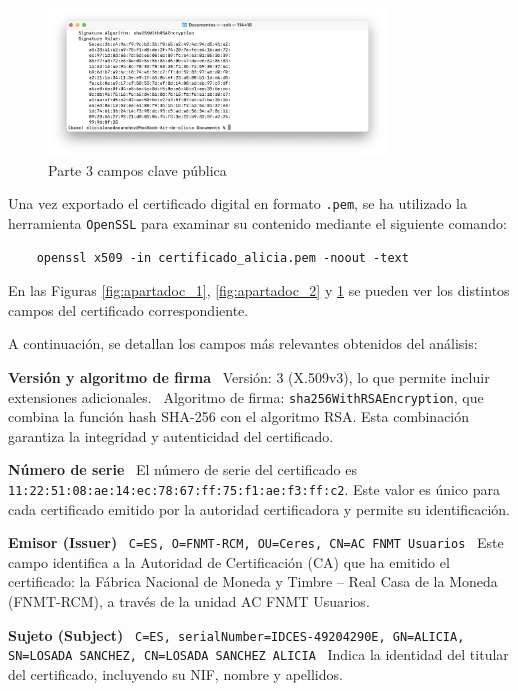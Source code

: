 \begin{figure}[H]
    \centering
    \includegraphics[width=0.8\textwidth]{apartadoc_3.png}
    \caption{Parte 3 campos clave pública}
    \label{fig:apartadoc_3}
\end{figure}

Una vez exportado el certificado digital en formato \texttt{.pem}, se ha utilizado la herramienta \texttt{OpenSSL} para examinar su contenido mediante el siguiente comando:


\begin{verbatim}
    openssl x509 -in certificado_alicia.pem -noout -text
\end{verbatim}



En las Figuras \ref{fig:apartadoc_1}, \ref{fig:apartadoc_2} y \ref{fig:apartadoc_3} se pueden ver los distintos campos del certificado correspondiente.  

A continuación, se detallan los campos más relevantes obtenidos del análisis:

\textbf{Versión y algoritmo de firma} \ Versión: 3 (X.509v3), lo que permite incluir extensiones adicionales. \ Algoritmo de firma: \texttt{sha256WithRSAEncryption}, que combina la función hash SHA-256 con el algoritmo RSA. Esta combinación garantiza la integridad y autenticidad del certificado.

\textbf{Número de serie} \ El número de serie del certificado es \texttt{11:22:51:08:ae:14:ec:78:67:ff:75:f1:ae:f3:ff:c2}. Este valor es único para cada certificado emitido por la autoridad certificadora y permite su identificación.

\textbf{Emisor (Issuer)} \ \texttt{C=ES, O=FNMT-RCM, OU=Ceres, CN=AC FNMT Usuarios} \ Este campo identifica a la Autoridad de Certificación (CA) que ha emitido el certificado: la Fábrica Nacional de Moneda y Timbre – Real Casa de la Moneda (FNMT-RCM), a través de la unidad AC FNMT Usuarios.

\textbf{Sujeto (Subject)} \ \texttt{C=ES, serialNumber=IDCES-49204290E, GN=ALICIA, SN=LOSADA SANCHEZ, CN=LOSADA SANCHEZ ALICIA} \ Indica la identidad del titular del certificado, incluyendo su NIF, nombre y apellidos.


